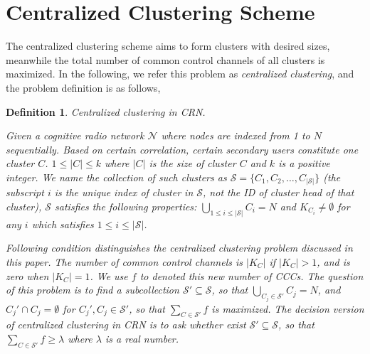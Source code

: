 \documentclass[10pt,journal,compsoc]{IEEEtran}
\theoremstyle{mytheoremstyle}
\theoremstyle{mytheoremstyle}
\theoremstyle{mytheoremstyle}
\newtheorem{mydef}{Definition}%
\begin{document}
\section{Centralized Clustering Scheme}
\label{centralized_scheme}



The centralized clustering scheme aims to form clusters with desired sizes, meanwhile the total number of common control channels of all clusters is maximized.
In the following, we refer this problem as \textit{centralized clustering}, and the problem definition is as follows, 


\begin{mydef}
\label{def_centralized_clustering}
\textit{Centralized clustering in CRN.}

Given a cognitive radio network $\mathcal{N}$ where nodes are indexed from 1 to $N$ sequentially.
Based on certain correlation, certain secondary users constitute one cluster $C$.
$1\leq |C| \leqslant k$ where $|C|$ is the size of cluster $C$ and $k$ is a positive integer.
We name the collection of such clusters as $\mathcal{S}=\{C_1, C_2,\ldots,C_{|\mathcal{S}|}\}$ (the subscript $i$ is the unique index of cluster in $\mathcal{S}$, not the ID of cluster head of that cluster), $\mathcal{S}$ satisfies the following properties: $\bigcup_{1\leq i \leq |\mathcal{S}|} C_i = N$ and $K_{C_i}\neq \emptyset$ for any $i$ which satisfies $1\leq i \leq |\mathcal{S}|$.

Following condition distinguishes the centralized clustering problem discussed in this paper.
The number of common control channels is $|K_{C}|$ if $|K_{C}|>1$, and is zero when $|K_{C}|=1$.
We use $f$ to denoted this new number of CCCs. 
The question of this problem is to find a subcollection $\mathcal{S}' \subseteq \mathcal{S}$, so that $\bigcup_{C_j\in \mathcal{S}'} C_j = N$, and $C_j'\cap C_j =\emptyset$ for $C_j', C_j\in \mathcal{S}'$, so that $\sum_{C\in \mathcal{S}'} f$ is maximized.
The decision version of centralized clustering in CRN is to ask whether exist $\mathcal{S}'\subseteq \mathcal{S}$, so that $\sum_{C\in \mathcal{S}'} f \geqslant \lambda$ where $\lambda$ is a real number.%
\end{mydef}
\end{document}

